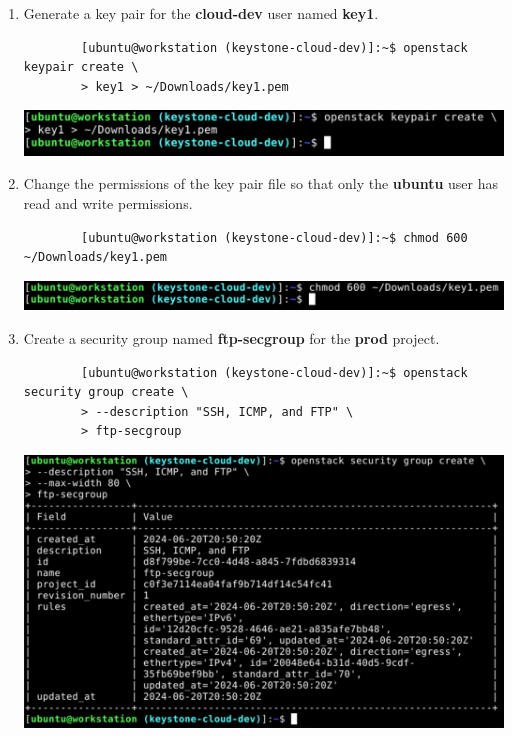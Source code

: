 \documentclass[letterpaper, 12pt]{article}
\begin{document}
\begin{enumerate}
    \item Generate a key pair for the \textbf{cloud-dev} user named \textbf{key1}.
    \begin{lstlisting}
        [ubuntu@workstation (keystone-cloud-dev)]:~$ openstack keypair create \
        > key1 > ~/Downloads/key1.pem
    \end{lstlisting}

    \begin{center}
        \includegraphics[width=\linewidth]{images/part1/step30.png}
    \end{center}

    \item Change the permissions of the key pair file so that only the \textbf{ubuntu} user has read and write
    permissions.
    \begin{lstlisting}
        [ubuntu@workstation (keystone-cloud-dev)]:~$ chmod 600 ~/Downloads/key1.pem
    \end{lstlisting}

    \begin{center}
        \includegraphics[width=\linewidth]{images/part1/step31.png}
    \end{center}

    \item Create a security group named \textbf{ftp-secgroup} for the \textbf{prod} project.
    \begin{lstlisting}
        [ubuntu@workstation (keystone-cloud-dev)]:~$ openstack security group create \
        > --description "SSH, ICMP, and FTP" \
        > ftp-secgroup
    \end{lstlisting}    

    \begin{center}
        \includegraphics[width=\linewidth]{images/part1/step32.png}
    \end{center}


\end{enumerate}
\end{document}
